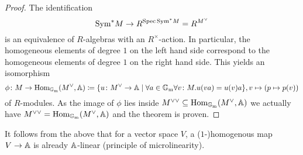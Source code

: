 \begin{proof}
  The identification
  \begin{equation*}
    \Sym^* M \to R^{\Spec \Sym^* M} = R^{M\spcheck}
  \end{equation*}
  is an equivalence of $R$-algebras with an $R^\times$-action.  In
  particular, the homogeneous elements of degree $1$ on the left hand
  side correspond to the homogeneous elements of degree $1$ on the
  right hand side.  This yields an isomorphism
  \begin{equation*}
    \phi\colon M \to \Hom_{\Gm}(M\spcheck, \A) \coloneqq \{u\colon M\spcheck \to \A \mid \forall a \in \Gm\forall v\colon M. u(v a) = u(v) a\},
    v \mapsto (p \mapsto p(v))
  \end{equation*}
  of $R$-modules.  As the image of $\phi$ lies inside
  $M^{\vee\vee} \subseteq \Hom_{\Gm}(M\spcheck, \A)$ we actually have
  $M^{\vee\vee} = \Hom_{\Gm}(M\spcheck, \A)$ and the theorem is
  proven.
\end{proof}

\begin{remark}
  It follows from the above that for a vector space $V$, a
  ($1$-)homogenous map $V \to \mathbb{A}$ is already $\mathbb{A}$-linear (principle of
  microlinearity).
\end{remark}

